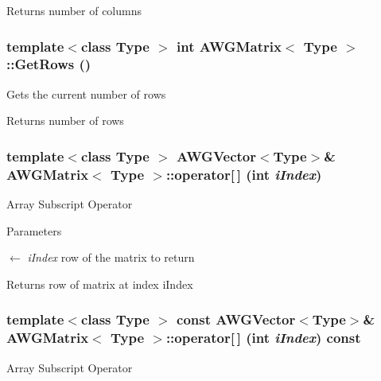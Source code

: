 \begin{DoxyReturn}{Returns}
number of columns 
\end{DoxyReturn}
\hypertarget{classAWGMatrix_a26d9705feb63ce376cc386a3e96f83b5}{
\subsubsection[{GetRows}]{\setlength{\rightskip}{0pt plus 5cm}template$<$class Type $>$ int {\bf AWGMatrix}$<$ Type $>$::GetRows ()}}
\label{classAWGMatrix_a26d9705feb63ce376cc386a3e96f83b5}
Gets the current number of rows

\begin{DoxyReturn}{Returns}
number of rows 
\end{DoxyReturn}
\hypertarget{classAWGMatrix_a3bc6ae621b7205dbb523b1d8d62d6602}{
\subsubsection[{operator[]}]{\setlength{\rightskip}{0pt plus 5cm}template$<$class Type $>$ {\bf AWGVector}$<$Type$>$\& {\bf AWGMatrix}$<$ Type $>$::operator\mbox{[}$\,$\mbox{]} (int {\em iIndex})}}
\label{classAWGMatrix_a3bc6ae621b7205dbb523b1d8d62d6602}
Array Subscript Operator


\begin{DoxyParams}{Parameters}
\item[\mbox{$\leftarrow$} {\em iIndex}]row of the matrix to return \end{DoxyParams}
\begin{DoxyReturn}{Returns}
row of matrix at index iIndex 
\end{DoxyReturn}
\hypertarget{classAWGMatrix_a0acfd19666f1a8c7e0a39d4606ff8247}{
\subsubsection[{operator[]}]{\setlength{\rightskip}{0pt plus 5cm}template$<$class Type $>$ const {\bf AWGVector}$<$Type$>$\& {\bf AWGMatrix}$<$ Type $>$::operator\mbox{[}$\,$\mbox{]} (int {\em iIndex}) const}}
\label{classAWGMatrix_a0acfd19666f1a8c7e0a39d4606ff8247}
Array Subscript Operator


